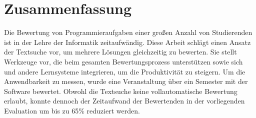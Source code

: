 \chapter*{Zusammenfassung}


Die Bewertung von Programmieraufgaben einer großen Anzahl von Studierenden ist in der Lehre der Informatik zeitaufwändig.
Diese Arbeit schlägt einen Ansatz der Textsuche vor, um mehrere Lösungen gleichzeitig zu bewerten.
Sie stellt Werkzeuge vor, die beim gesamten Bewertungsprozess unterstützen sowie sich und andere Lernsysteme integrieren, um die Produktivität zu steigern.
Um die Anwendbarkeit zu messen, wurde eine Veranstaltung über ein Semester mit der Software bewertet.
Obwohl die Textsuche keine vollautomatische Bewertung erlaubt, konnte dennoch der Zeitaufwand der Bewertenden in der vorliegenden Evaluation um bis zu 65\% reduziert werden.
